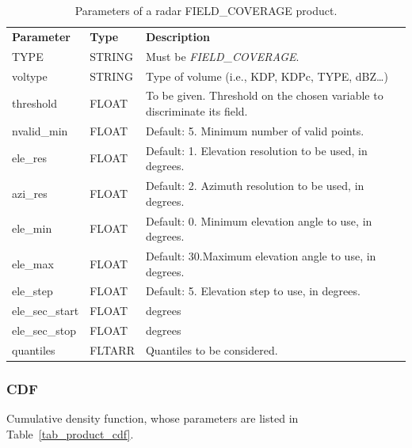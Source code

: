 \documentclass[a4paper,11pt,pdftex,twoside]{scrartcl}
\renewcommand{\bf}{\normalfont \bfseries}
\begin{document}
{{{\begin{table}[H]
 \begin{tabularx}{\textwidth}{llX}
 \bf{Parameter}  & \bf{Type}  & \bf{Description}\\
 TYPE           & STRING      & Must be \emph{FIELD\_COVERAGE}.\\
 voltype        & STRING      & Type of volume (i.e., KDP, KDPc, TYPE, dBZ\dots)\\
 threshold      & FLOAT       & To be given. Threshold on the chosen variable to discriminate its field.\\
 nvalid\_min & FLOAT &  Default: 5. Minimum number of valid points.\\
 ele\_res & FLOAT &  Default: 1. Elevation resolution to be used, in degrees.\\
 azi\_res & FLOAT &  Default: 2. Azimuth resolution to be used, in degrees.\\
 ele\_min & FLOAT &  Default: 0. Minimum elevation angle to use, in degrees.\\
 ele\_max & FLOAT &  Default: 30.Maximum elevation angle to use, in degrees.\\
 ele\_step & FLOAT &  Default: 5. Elevation step to use, in degrees.\\
 ele\_sec\_start & FLOAT & degrees \\
 ele\_sec\_stop & FLOAT &  degrees \\
 quantiles & FLTARR & Quantiles to be considered. \\
 \end{tabularx}
 \caption{Parameters of a radar FIELD\_COVERAGE product.}
 \label{tab_product_field_coverage}
 \end{table}

\subsubsection{CDF}
   \label{subsec_cdf}
Cumulative density function, whose parameters are listed in  Table~\ref{tab_product_cdf}.

}}}
\end{document}
